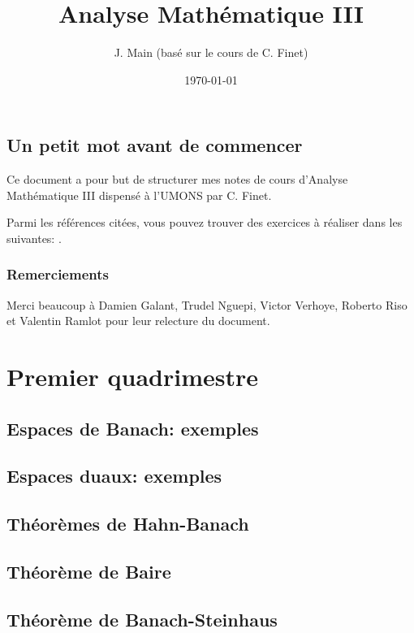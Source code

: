 \documentclass[a4paper, 12pt]{book}
\title{Analyse Mathématique III}
\author{J. Main (basé sur le cours de C. Finet)}
\date{\today}
\theoremstyle{definition} \newtheorem{df}{D\'{e}finition}[chapter]
\theoremstyle{definition} \newtheorem{ex}[df]{Exemple}
\theoremstyle{definition} \newtheorem{thm}[df]{Th\'{e}or\`{e}me}
\theoremstyle{definition} \newtheorem{cor}[df]{Corollaire}
\theoremstyle{definition} \newtheorem{lem}[df]{Lemme}
\theoremstyle{definition} \newtheorem{prop}[df]{Proposition}
\theoremstyle{definition} \newtheorem{rem}[df]{Remarque}
\theoremstyle{definition} \newtheorem{exo}{Exercice}[chapter]
\begin{document}
\frontmatter

\maketitle

\tableofcontents
\chapter{Un petit mot avant de commencer}
Ce document a pour but de structurer mes notes de cours
 d'Analyse Mathématique III dispensé à l'UMONS par C. Finet.

Parmi les références citées, vous pouvez trouver des exercices
à réaliser dans les suivantes: \cite{hb:exo1}.

\section*{Remerciements}

Merci beaucoup à Damien Galant, Trudel Nguepi, Victor Verhoye, Roberto Riso et
Valentin Ramlot pour leur relecture du document.

\mainmatter
\part{Premier quadrimestre}
\chapter{Espaces de Banach: exemples}


\chapter{Espaces duaux: exemples}


\chapter{Théorèmes de Hahn-Banach}


\chapter{Théorème de Baire}


\chapter{Théorème de Banach-Steinhaus}

\end{document}

